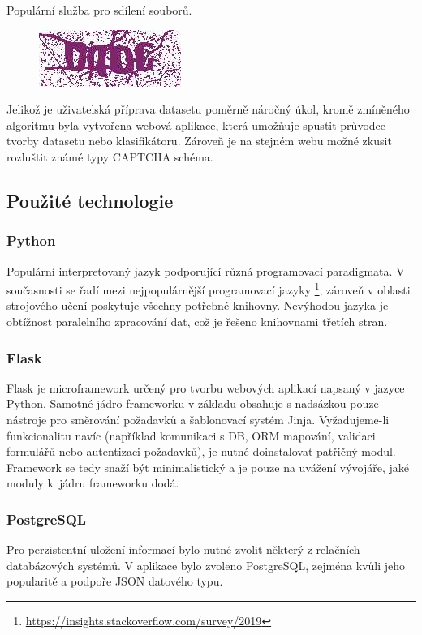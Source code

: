 \documentclass[
  field=ainfp,
  master=true,
  biblatex,
  sourcecodes=false,
  theorems=false,
  glossaries,
  index
]{kidiplom}
\begin{document}
\begin{description}[align=left]
\item  [ulozto.cz] Populární služba pro sdílení souborů.
\begin{figure}[H]
  \centering
  \includegraphics{images/ulozto.jpg}
\end{figure}
\end{description}


Jelikož je uživatelská příprava datasetu poměrně náročný úkol, kromě zmíně\-ného algoritmu byla vytvořena webová aplikace, která umožňuje spustit průvodce tvorby datasetu nebo klasifikátoru. Zároveň je na stejném webu možné zkusit rozluštit známé typy CAPTCHA schéma. 

\subsection{Použité technologie}
\subsubsection*{Python}
Populární interpretovaný jazyk podporující různá programovací paradigmata. V současnosti se řadí mezi 
nejpopulárnější programovací jazyky \footnote{\url{https://insights.stackoverflow.com/survey/2019}}, zároveň v oblasti strojového učení poskytuje všechny potřebné knihovny. Nevýhodou jazyka je obtížnost paralelního zpracování dat, což je řešeno knihovnami třetích stran.

\subsubsection*{Flask}
Flask je microframework určený pro tvorbu webových aplikací napsaný v jazyce Python. Samotné jádro frameworku v základu obsahuje s nadsázkou pouze ná\-stroje pro směrování požadavků a šablonovací systém Jinja. Vyžadujeme-li funk\-cio\-nalitu navíc (například komunikaci s DB, ORM mapování, validaci formulářů nebo autentizaci požadavků), je nutné doinstalovat patřičný modul. Framework se tedy snaží být minimalistický a je pouze na uvážení vývojáře, jaké moduly k~jádru frameworku dodá. 
\subsubsection*{PostgreSQL}
Pro perzistentní uložení informací bylo nutné zvolit některý z relačních databázových systémů. V aplikace bylo zvoleno PostgreSQL, zejména kvůli jeho popularitě a podpoře JSON datového typu. 
\end{document}
